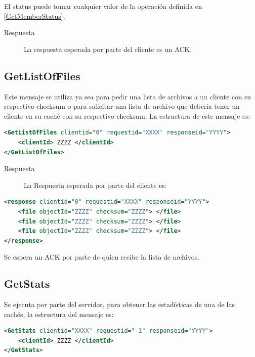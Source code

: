 El status puede tomar cualquier valor de la operación definida en \ref{GetMemberStatus}. 


\begin{description}
\item[Respuesta] La respuesta esperada por parte del cliente es un ACK.
\end{description}

\subsection{GetListOfFiles}

Este mensaje se utiliza ya sea para pedir una lista de archivos a un cliente con su respectivo checksum o para solicitar una lista de archivo que debería tener un cliente en su caché con su respectivo checksum. La estructura de este mensaje es:

\begin{lstlisting}[language=XML,caption=Mensaje de GetListOfFiles]
<GetListOfFiles clientid="0" requestid="XXXX" responseid="YYYY"> 
	<clientId> ZZZZ </clientId>
</GetListOfFiles>
\end{lstlisting}

\begin{description}
\item[Respuesta] La Respuesta esperada por parte del cliente es:
\end{description}

\begin{lstlisting}[language=XML,caption=Mensaje de Respuesta de GetListOfFiles]
<response clientid="0" requestid="XXXX" responseid="YYYY"> 
	<file objectId="ZZZZ" checksum="ZZZZ"> </file>
	<file objectId="ZZZZ" checksum="ZZZZ"> </file>
	<file objectId="ZZZZ" checksum="ZZZZ"> </file>
</response>
\end{lstlisting}

Se espera un ACK por parte de quien recibe la lista de archivos.

\subsection{GetStats}
Se ejecuta por parte del servidor, para obtener las estadísticas de una de las cachés, la estructura del mensaje es:

\begin{lstlisting}[language=XML,caption=Mensaje de GetStats]
<GetStats clientid="XXXX" requestid="-1" responseid="YYYY"> 
	<clientId> ZZZZ </clientId>
</GetStats>
\end{lstlisting}



